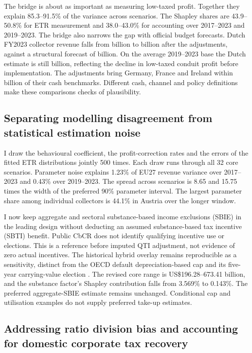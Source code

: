 \documentclass[11pt,a4paper]{article}
\newcommand{\EUR}{\texteuro}
\newcommand{\usd}{US\$}
\begin{document}
The bridge is about as important as measuring low-taxed profit. Together they explain 85.3–91.5\% of the variance across scenarios. The Shapley shares are 43.9–50.8\% for ETR measurement and 38.0–43.0\% for accounting over 2017–2023 and 2019–2023. The bridge also narrows the gap with official budget forecasts. Dutch FY2023 collector revenue falls from \EUR7.09 billion to \EUR0.45 billion after the adjustments, against a structural forecast of \EUR0.18 billion. On the average 2019–2023 base the Dutch estimate is still \EUR3.43 billion, reflecting the decline in low-taxed conduit profit before implementation. The adjustments bring Germany, France and Ireland within \EUR0.5 billion of their cash benchmarks. Different cash, channel and policy definitions make these comparisons checks of plausibility.

\subsection{Separating modelling disagreement from statistical estimation noise}

I draw the behavioural coefficient, the profit-correction rates and the errors of the fitted ETR distributions jointly 500 times. Each draw runs through all 32 core scenarios. Parameter noise explains 1.23\% of EU27 revenue variance over 2017–2023 and 0.43\% over 2019–2023. The spread across scenarios is 8.65 and 15.75 times the width of the preferred 90\% parameter interval. The largest parameter share among individual collectors is 44.1\% in Austria over the longer window.

I now keep aggregate and sectoral substance-based income exclusions (SBIE) in the leading design without deducting an assumed substance-based tax incentive (SBTI) benefit. Public CbCR does not identify qualifying incentive use or elections. This is a reference before imputed QTI adjustment, not evidence of zero actual incentives. The historical hybrid overlay remains reproducible as a sensitivity, distinct from the OECD default depreciation-based cap and its five-year carrying-value election \citep{oecd2026}. The revised core range is \usd196.28–673.41 billion, and the substance factor's Shapley contribution falls from 3.569\% to 0.143\%. The preferred aggregate-SBIE estimate remains unchanged. Conditional cap and utilisation examples do not supply preferred take-up estimates.

\subsection{Addressing ratio division bias and accounting for domestic corporate tax recovery}
\end{document}
